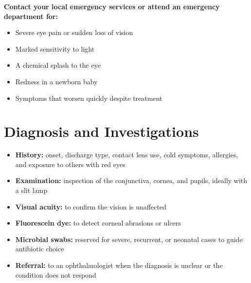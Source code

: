 \textbf{Contact your local emergency services or attend an emergency department for:}
\begin{itemize}
    \item Severe eye pain or sudden loss of vision
    \item Marked sensitivity to light
    \item A chemical splash to the eye
    \item Redness in a newborn baby
    \item Symptoms that worsen quickly despite treatment
\end{itemize}

\section*{Diagnosis and Investigations}
\begin{itemize}
    \item \textbf{History:} onset, discharge type, contact lens use, cold symptoms, allergies, and exposure to others with red eyes
    \item \textbf{Examination:} inspection of the conjunctiva, cornea, and pupils, ideally with a slit lamp
    \item \textbf{Visual acuity:} to confirm the vision is unaffected
    \item \textbf{Fluorescein dye:} to detect corneal abrasions or ulcers
    \item \textbf{Microbial swabs:} reserved for severe, recurrent, or neonatal cases to guide antibiotic choice
    \item \textbf{Referral:} to an ophthalmologist when the diagnosis is unclear or the condition does not respond
\end{itemize}

